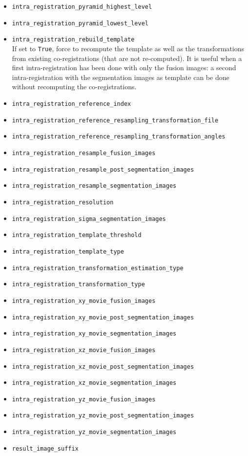 \begin{itemize}
\item \texttt{intra\_registration\_pyramid\_highest\_level}
\item \texttt{intra\_registration\_pyramid\_lowest\_level}
\item \texttt{intra\_registration\_rebuild\_template}\\
  If set to \texttt{True}, force to recompute the template as well as the
  transformations from existing co-registrations (that are not
  re-computed). It is useful when a first intra-registration has been
  done with only the fusion images: a second intra-registration with
  the segmentation images as template can be done without recomputing the co-registrations.
\item \texttt{intra\_registration\_reference\_index}
\item \texttt{intra\_registration\_reference\_resampling\_transformation\_file}
\item \texttt{intra\_registration\_reference\_resampling\_transformation\_angles}
\item \texttt{intra\_registration\_resample\_fusion\_images}
\item \texttt{intra\_registration\_resample\_post\_segmentation\_images}
\item \texttt{intra\_registration\_resample\_segmentation\_images}
\item \texttt{intra\_registration\_resolution}
\item \texttt{intra\_registration\_sigma\_segmentation\_images}
\item \texttt{intra\_registration\_template\_threshold}
\item \texttt{intra\_registration\_template\_type}
\item \texttt{intra\_registration\_transformation\_estimation\_type}
\item \texttt{intra\_registration\_transformation\_type}
\item \texttt{intra\_registration\_xy\_movie\_fusion\_images}
\item \texttt{intra\_registration\_xy\_movie\_post\_segmentation\_images}
\item \texttt{intra\_registration\_xy\_movie\_segmentation\_images}
\item \texttt{intra\_registration\_xz\_movie\_fusion\_images}
\item \texttt{intra\_registration\_xz\_movie\_post\_segmentation\_images}
\item \texttt{intra\_registration\_xz\_movie\_segmentation\_images}
\item \texttt{intra\_registration\_yz\_movie\_fusion\_images}
\item \texttt{intra\_registration\_yz\_movie\_post\_segmentation\_images}
\item \texttt{intra\_registration\_yz\_movie\_segmentation\_images}
\item \texttt{result\_image\_suffix}
\end{itemize}
